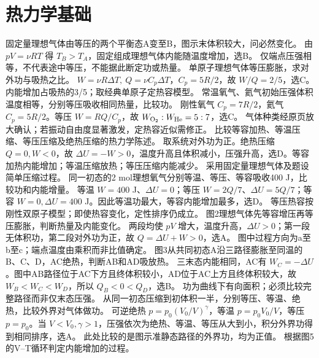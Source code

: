 \section{热力学基础}
\problemtext 固定量理想气体由等压的两个平衡态A变至B，图示末体积较大，问必然变化。
\workings 由 $pV=\nu RT$ 得 $T_B>T_A$，固定组成理想气体内能随温度增加，选B。
\crosscheck 仅端点压强相等，不代表途中等压，不能据此断定功或热量。
\problemtext 单原子理想气体等压膨胀，求对外功与吸热之比。
\workings $W=\nu R\Delta T,\ Q=\nu C_p\Delta T$，$C_p=5R/2$，故 $W/Q=2/5$，选C。
\crosscheck 内能增加占吸热的3/5；取经典单原子定热容模型。
\problemtext 常温氧气、氦气初始压强体积温度相等，分别等压吸收相同热量，比较功。
\workings 刚性氧气 $C_p=7R/2$，氦气 $C_p=5R/2$。等压 $W=RQ/C_p$，故 $W_{\rm O_2}:W_{\rm He}=5:7$，选C。
\crosscheck 气体种类经原页放大确认；若振动自由度显著激发，定热容近似需修正。
\problemtext 比较等容加热、等温压缩、等压压缩及绝热压缩的热力学陈述。
\workings 取系统对外功为正。绝热压缩 $Q=0,W<0$，故 $\Delta U=-W>0$，温度升高且体积减小，压强升高，选D。等容加热内能增加；等温压缩放热；等压压缩内能减少。
\crosscheck 采用固定量理想气体及题设简单压缩过程。
\problemtext 同一初态的2 mol理想氧气分别等温、等压、等容吸收400 J，比较功和内能增量。
\workings 等温 $W=400$ J、$\Delta U=0$；等压 $W=2Q/7$、$\Delta U=5Q/7$；等容 $W=0,\Delta U=400$ J。因此等温功最大，等容内能增加最多，选D。
\crosscheck 等压热容按刚性双原子模型；即使热容变化，定性排序仍成立。
\problemtext 图2理想气体先等容增压再等压膨胀，判断热量及内能变化。
\workings 两段均使 $pV$ 增大，温度升高，$\Delta U>0$；第一段无体积功，第二段对外功为正，故 $Q=\Delta U+W>0$，选A。
\crosscheck 图中过程方向为a至b至c；端点温度由乘积而非比值确定。
\problemtext 图3从共同初态A沿三路径膨胀至同温的B、C、D，AC绝热，判断AB和AD吸放热。
\workings 三末态内能相同，AC有 $W_C=-\Delta U$。图中AB路径位于AC下方且终体积较小，AD位于AC上方且终体积较大，故 $W_B<W_C<W_D$，所以 $Q_B<0<Q_D$，选B。
\crosscheck 功为曲线下有向面积；必须比较完整路径而非仅末态压强。
\problemtext 从同一初态压缩到初体积一半，分别等压、等温、绝热，比较外界对气体做功。
\workings 可逆绝热 $p=p_0(V_0/V)^\gamma$，等温 $p=p_0V_0/V$，等压 $p=p_0$。当 $V<V_0,\gamma>1$，压强依次为绝热、等温、等压从大到小，积分外界功得到相同排序，选A。
\crosscheck 此处比较的是图示准静态路径的外界功，均为正值。
\problemtext 根据图5的V--T循环判定内能增加的过程。
